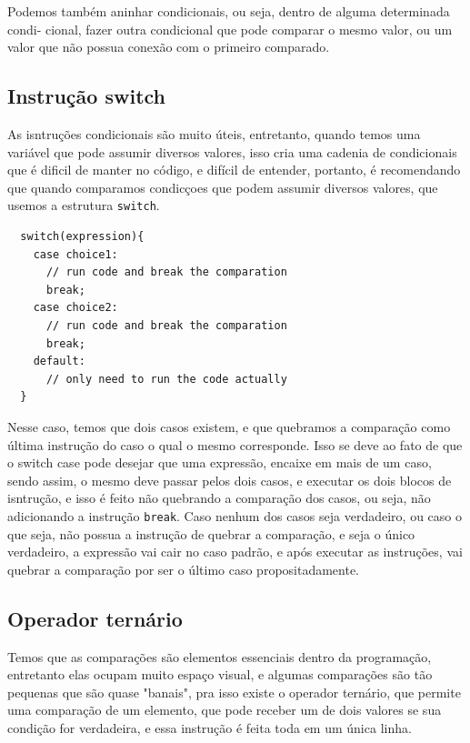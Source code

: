 \documentclass[12pt, a4paper]{paper}
\begin{document}
Podemos também aninhar condicionais, ou seja, dentro de alguma determinada condi-
cional, fazer outra condicional que pode comparar o mesmo valor, ou um valor que não possua
conexão com o primeiro comparado.

\subsection{Instrução switch} %
\label{sub:Instrução switch}
As isntruções condicionais são muito úteis, entretanto, quando temos uma variável
que pode assumir diversos valores, isso cria uma cadenia de condicionais que é dificil
de manter no código, e difícil de entender, portanto, é recomendando que quando 
comparamos condicçoes que podem assumir diversos valores, que usemos 
a estrutura \texttt{switch}.

\begin{verbatim}
  switch(expression){
    case choice1:
      // run code and break the comparation
      break;
    case choice2:
      // run code and break the comparation
      break;
    default:
      // only need to run the code actually
  } 
\end{verbatim}

Nesse caso, temos que dois casos existem, e que quebramos a comparação como última 
instrução do caso o qual o mesmo corresponde. Isso se deve ao fato de que o switch case 
pode desejar que uma expressão, encaixe em mais de um caso, sendo assim, o mesmo deve 
passar pelos dois casos, e executar os dois blocos de isntrução, e isso é feito não 
quebrando a comparação dos casos, ou seja, não adicionando a instrução \texttt{break}.
Caso nenhum dos casos seja verdadeiro, ou caso o que seja, não possua a instrução de 
quebrar a comparação, e seja o único verdadeiro, a expressão vai cair no caso padrão, 
e após executar as instruções, vai quebrar a comparação por ser o último caso 
propositadamente.

\subsection{Operador ternário} %
\label{sub:Operador ternário}
Temos que as comparações são elementos essenciais dentro da programação, entretanto 
elas ocupam muito espaço visual, e algumas comparações são tão pequenas que são quase
"banais", pra isso existe o operador ternário, que permite uma comparação de um 
elemento, que pode receber um de dois valores se sua condição for verdadeira, e essa 
instrução é feita toda em um única linha.
\end{document}
